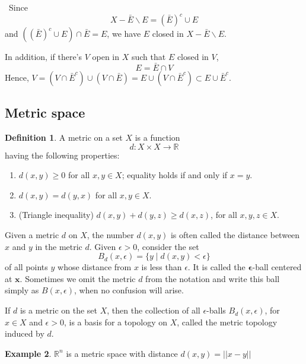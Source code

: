 \documentclass[12pt,a4paper]{book}
\newenvironment{prooff}{{\noindent\it\textcolor{cyan!40!black}{Proof}:}\,}{\par}
\newcommand{\bb}[1]{\mathbb{#1}}
\newenvironment{enu}{\begin{enumerate}[(1)]}{\end{enumerate}}
\theoremstyle{definition}
\newtheorem{defn}{Definition}[section]
\newtheorem{exam}[defn]{Example}
\begin{document}
\begin{prooff}
    Since 
    \begin{equation*}
        X-\bar{E}\backslash E=(\bar{E})^c\cup E 
    \end{equation*}
    and $((\bar{E})^c\cup E) \cap \bar{E}=E$, we have $E$ closed in  $X-\bar{E}\backslash E$.
    
    In addition, if there's $V$ open in $X$ such that $E$ closed in $V$, 
    \begin{equation*}
        E=\bar{E}\cap V
    \end{equation*}
    Hence, $V=(V\cap \bar{E}^c)\cup (V\cap \bar{E})=E\cup (V\cap \bar{E}^c)\subset E\cup \bar{E}^c$.
\end{prooff}




\subsection{Metric space}
\begin{defn}
    A metric on a set $X$ is a function
    $$
        d: X \times X \longrightarrow \bb{R}
    $$
    having the following properties:
    \begin{enu}
        \item  $d(x, y) \geq 0$ for all $x, y \in X$; equality holds if and only if $x=y$.
        \item  $d(x, y)=d(y, x)$ for all $x, y \in X$.
        \item  (Triangle inequality) $d(x, y)+d(y, z) \geq d(x, z)$, for all $x, y, z \in X$.
    \end{enu}
    Given a metric $d$ on $X$, the number $d(x, y)$ is often called the distance between $x$ and $y$ in the metric $d$. Given $\epsilon>0$, consider the set
    $$
        B_d(x, \epsilon)=\{y \mid d(x, y)<\epsilon\}
    $$
    of all points $y$ whose distance from $x$ is less than $\epsilon$. It is called the $\boldsymbol{\epsilon}$-ball centered at $\boldsymbol{x}$. Sometimes we omit the metric $d$ from the notation and write this ball simply as $B(x, \epsilon)$, when no confusion will arise.

    If $d$ is a metric on the set $X$, then the collection of all $\epsilon$-balls $B_d(x, \epsilon)$, for $x \in X$ and $\epsilon>0$, is a basis for a topology on $X$, called the metric topology induced by $d$.
\end{defn}
\begin{exam}
    $\bb{R}^n$ is a metric space with distance $d(x,y)=||x-y||$
\end{exam}
\end{document}
